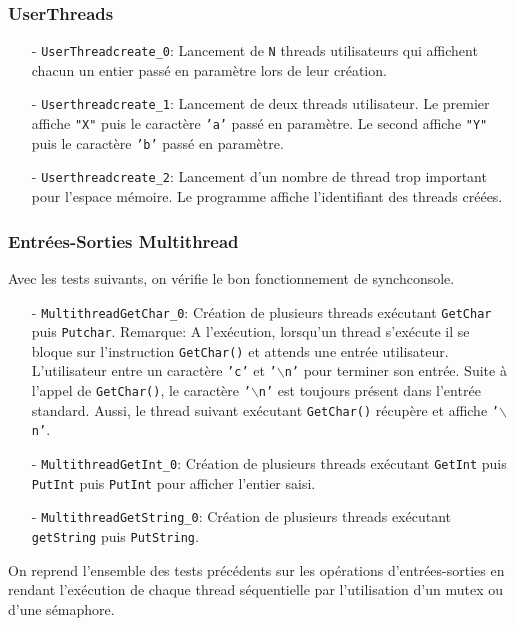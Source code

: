 \documentclass[11pt]{article}
\theoremstyle{definition}
\theoremstyle{definition}
\begin{document}
\subsubsection{UserThreads}
\begin{itemize}
\item[-] \texttt{UserThreadcreate\_0}: Lancement de \texttt{N} threads utilisateurs qui affichent chacun un entier passé en paramètre lors de leur
  création.
\item[-] \texttt{Userthreadcreate\_1}: Lancement de deux threads utilisateur. Le premier affiche \texttt{"X"} puis le caractère \texttt{'a'} passé en paramètre.
  Le second affiche \texttt{"Y"} puis le caractère \texttt{'b'} passé en paramètre.
\item[-] \texttt{Userthreadcreate\_2}: Lancement d'un nombre de thread trop important pour l'espace mémoire.
  Le programme affiche l'identifiant des threads créées.
\end{itemize}

\subsubsection{Entrées-Sorties Multithread}
Avec les tests suivants, on vérifie le bon fonctionnement de synchconsole.
\begin{itemize}
\item[-] \texttt{MultithreadGetChar\_0}: Création de plusieurs threads exécutant \texttt{GetChar}
  puis \texttt{Putchar}.
  Remarque:
  A l'exécution, lorsqu'un thread s'exécute il se bloque sur l'instruction \texttt{GetChar()} et attends une
  entrée utilisateur. L'utilisateur entre un caractère \texttt{'c'} et \texttt{'$\backslash$n'} pour terminer son entrée.
  Suite à l'appel de \texttt{GetChar()}, le caractère \texttt{'$\backslash$n'} est toujours
  présent dans l'entrée standard. Aussi, le thread suivant exécutant \texttt{GetChar()} récupère et
  affiche \texttt{'$\backslash$n'}.
\item[-] \texttt{MultithreadGetInt\_0}: Création de plusieurs threads exécutant \texttt{GetInt} puis  \texttt{PutInt}
  puis \texttt{PutInt} pour afficher l'entier saisi.
\item[-] \texttt{MultithreadGetString\_0}: Création de plusieurs threads exécutant
  \texttt{get}\hspace{0pt}\texttt{String} puis \texttt{PutString}.
\end{itemize}
On reprend l'ensemble des tests précédents sur les opérations d'entrées-sorties en rendant l'exécution de chaque thread séquentielle par l'utilisation d'un mutex ou d'une sémaphore.
\end{document}
